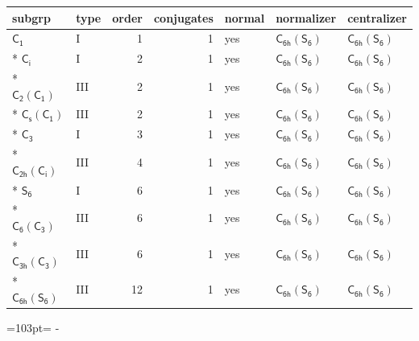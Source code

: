 \documentclass[10pt,a4paper]{article}
\newcommand{\needspace}[1]{\par\penalty-100\begingroup\dimen0=#1\relax\dimen2=\pagegoal
  \advance\dimen2-\pagetotal\ifdim\dimen0>\dimen2\relax\ifdim\dimen2>0pt\vfil\break\fi\fi
  \endgroup}
\numberwithin{equation}{section}
\newcommand{\grp}[1]{\mathsf{#1}}
\begin{document}
{\small\begin{longtable}{@{}llrrlll@{}}\toprule
subgrp & type & order & conjugates & normal & normalizer & centralizer\\\midrule\endhead
\bottomrule\endfoot\endlastfoot
\href{../../../rotation/data/pdf/C1.pdf}{$\grp{C_{1}}$} & I & 1 & 1 & yes & \href{C6h-S6.pdf}{$\grp{C_{6h}}(\grp{S_{6}})$} & \href{C6h-S6.pdf}{$\grp{C_{6h}}(\grp{S_{6}})$}\\*
\href{../../../rotation/data/pdf/S2.pdf}{$\grp{C_{i}}$} & I & 2 & 1 & yes & \href{C6h-S6.pdf}{$\grp{C_{6h}}(\grp{S_{6}})$} & \href{C6h-S6.pdf}{$\grp{C_{6h}}(\grp{S_{6}})$}\\*
\href{C2-C1.pdf}{$\grp{C_{2}}(\grp{C_{1}})$} & III & 2 & 1 & yes & \href{C6h-S6.pdf}{$\grp{C_{6h}}(\grp{S_{6}})$} & \href{C6h-S6.pdf}{$\grp{C_{6h}}(\grp{S_{6}})$}\\*
\href{C1v-C1.pdf}{$\grp{C_{s}}(\grp{C_{1}})$} & III & 2 & 1 & yes & \href{C6h-S6.pdf}{$\grp{C_{6h}}(\grp{S_{6}})$} & \href{C6h-S6.pdf}{$\grp{C_{6h}}(\grp{S_{6}})$}\\*
\href{../../../rotation/data/pdf/C3.pdf}{$\grp{C_{3}}$} & I & 3 & 1 & yes & \href{C6h-S6.pdf}{$\grp{C_{6h}}(\grp{S_{6}})$} & \href{C6h-S6.pdf}{$\grp{C_{6h}}(\grp{S_{6}})$}\\*
\href{C2h-S2.pdf}{$\grp{C_{2h}}(\grp{C_{i}})$} & III & 4 & 1 & yes & \href{C6h-S6.pdf}{$\grp{C_{6h}}(\grp{S_{6}})$} & \href{C6h-S6.pdf}{$\grp{C_{6h}}(\grp{S_{6}})$}\\*
\href{../../../rotation/data/pdf/S6.pdf}{$\grp{S_{6}}$} & I & 6 & 1 & yes & \href{C6h-S6.pdf}{$\grp{C_{6h}}(\grp{S_{6}})$} & \href{C6h-S6.pdf}{$\grp{C_{6h}}(\grp{S_{6}})$}\\*
\href{C6-C3.pdf}{$\grp{C_{6}}(\grp{C_{3}})$} & III & 6 & 1 & yes & \href{C6h-S6.pdf}{$\grp{C_{6h}}(\grp{S_{6}})$} & \href{C6h-S6.pdf}{$\grp{C_{6h}}(\grp{S_{6}})$}\\*
\href{C3h-C3.pdf}{$\grp{C_{3h}}(\grp{C_{3}})$} & III & 6 & 1 & yes & \href{C6h-S6.pdf}{$\grp{C_{6h}}(\grp{S_{6}})$} & \href{C6h-S6.pdf}{$\grp{C_{6h}}(\grp{S_{6}})$}\\*
\href{C6h-S6.pdf}{$\grp{C_{6h}}(\grp{S_{6}})$} & III & 12 & 1 & yes & \href{C6h-S6.pdf}{$\grp{C_{6h}}(\grp{S_{6}})$} & \href{C6h-S6.pdf}{$\grp{C_{6h}}(\grp{S_{6}})$}\\
\bottomrule\end{longtable}}
\needspace{103pt}
\end{document}
